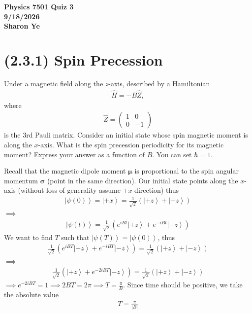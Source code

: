 \documentclass[11pt, answers]{exam}
\newcommand{\ket}[1]{\left\lvert {#1}\right\rangle}
\begin{document}
	\begin{center}
		\Large \bf Physics 7501 Quiz 3 \\ 9/18/2026 \\ Sharon Ye
	\end{center}
	
	\section*{(2.3.1) Spin Precession}
	Under a magnetic field along the $z$-axis, described by a Hamiltonian
	\begin{align*}
		\hat{H} = -B\hat{Z},
	\end{align*}
	where
	\begin{align*}
		\hat{Z}
		=
		\begin{pmatrix}
			1 & 0 \\
			0 & -1
		\end{pmatrix}
	\end{align*}
	is the 3rd Pauli matrix. Consider an initial state whose spin magnetic moment is along the $x$-axis. What is the spin precession periodicity for its magnetic moment? Express your answer as a function of $B$. You can set $\hbar = 1$.
	
	\begin{solution}
		Recall that the magnetic dipole moment $\boldsymbol{\mu}$ is proportional to the spin angular momentum $\boldsymbol{\sigma}$ (point in the same direction). Our initial state points along the $x$-axis (without loss of generality assume $+x$-direction) thus
		\begin{align*}
			\ket{\psi(0)} = \ket{+x} = \frac{1}{\sqrt{2}}\left(\ket{+z}+\ket{-z}\right)
		\end{align*}
		$\implies$
		\begin{align*}
			\ket{\psi(t)} = \frac{1}{\sqrt{2}}\left(e^{iBt}\ket{+z}+e^{-iBt}\ket{-z}\right)
		\end{align*}
		We want to find $T$ such that $\ket{\psi(T)}=\ket{\psi(0)}$, thus
		\begin{align*}
			\frac{1}{\sqrt{2}}\left(e^{iBT}\ket{+z}+e^{-iBT}\ket{-z}\right) = \frac{1}{\sqrt{2}}\left(\ket{+z}+\ket{-z}\right)
		\end{align*}
		$\implies$
		\begin{align*}
			\frac{1}{\sqrt{2}}\left(\ket{+z}+e^{-2iBT}\ket{-z}\right) = \frac{1}{\sqrt{2}}\left(\ket{+z}+\ket{-z}\right)
		\end{align*}
		$\implies e^{-2iBT}=1 \implies 2BT = 2\pi \implies T = \frac{\pi}{B}$. Since time should be positive, we take the absolute value
		\begin{align*}
			T=\frac{\pi}{|B|}
		\end{align*}
	\end{solution}
	
\end{document}
